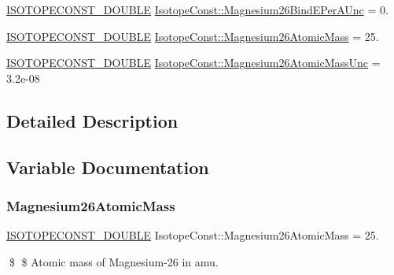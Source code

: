 \begin{DoxyCompactItemize}
\mbox{\hyperlink{group___isotope_const-_macros_ga8f45a7272ce02c0b4c65c44636ed719a}{I\+S\+O\+T\+O\+P\+E\+C\+O\+N\+S\+T\+\_\+\+D\+O\+U\+B\+LE}} \mbox{\hyperlink{group___isotope_const-_magnesium-_mg26_gab399a554656b49843f41f8ce8e6380e2}{Isotope\+Const\+::\+Magnesium26\+Bind\+E\+Per\+A\+Unc}} = 0.
\item 
\mbox{\hyperlink{group___isotope_const-_macros_ga8f45a7272ce02c0b4c65c44636ed719a}{I\+S\+O\+T\+O\+P\+E\+C\+O\+N\+S\+T\+\_\+\+D\+O\+U\+B\+LE}} \mbox{\hyperlink{group___isotope_const-_magnesium-_mg26_gabdf58bd43acbb886874f9f76a13a8a96}{Isotope\+Const\+::\+Magnesium26\+Atomic\+Mass}} = 25.
\item 
\mbox{\hyperlink{group___isotope_const-_macros_ga8f45a7272ce02c0b4c65c44636ed719a}{I\+S\+O\+T\+O\+P\+E\+C\+O\+N\+S\+T\+\_\+\+D\+O\+U\+B\+LE}} \mbox{\hyperlink{group___isotope_const-_magnesium-_mg26_ga6703c49c14dec7a70bcb62bc402626c2}{Isotope\+Const\+::\+Magnesium26\+Atomic\+Mass\+Unc}} = 3.\+2e-\/08
\end{DoxyCompactItemize}


\subsection{Detailed Description}


\subsection{Variable Documentation}
\mbox{\label{group___isotope_const-_magnesium-_mg26_gabdf58bd43acbb886874f9f76a13a8a96}} 
\subsubsection{\texorpdfstring{Magnesium26\+Atomic\+Mass}{Magnesium26AtomicMass}}
{\footnotesize\ttfamily \mbox{\hyperlink{group___isotope_const-_macros_ga8f45a7272ce02c0b4c65c44636ed719a}{I\+S\+O\+T\+O\+P\+E\+C\+O\+N\+S\+T\+\_\+\+D\+O\+U\+B\+LE}} Isotope\+Const\+::\+Magnesium26\+Atomic\+Mass = 25.}

\$ \$ Atomic mass of Magnesium-\/26 in amu. \mbox{\label{group___isotope_const-_magnesium-_mg26_ga6703c49c14dec7a70bcb62bc402626c2}} 
